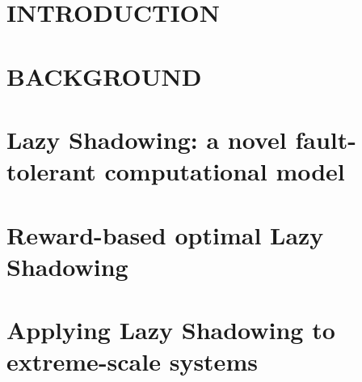 \documentclass[driverfallback=dvipdfmx,final]{pittetd}
\begin{document}


\tableofcontents
%
%
\chapter{INTRODUCTION}
\label{chapter:intro}


\chapter{BACKGROUND}
\label{chapter:background}


\chapter{Lazy Shadowing: a novel fault-tolerant computational model}
\label{chapter:shadowing}


\chapter{Reward-based optimal Lazy Shadowing}
\label{chapter:reward}


\chapter{Applying Lazy Shadowing to extreme-scale systems}
\label{chapter:scale}

\end{document}
